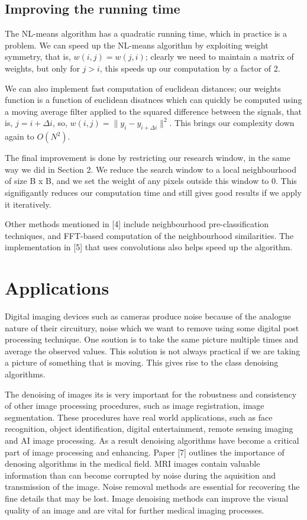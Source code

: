\documentclass[11pt, twocolumn]{article}
\begin{document}
\subsection{Improving the running time}
The NL-means algorithm has a quadratic running time, which in practice is a problem. We can speed up the NL-means algorithm by exploiting weight symmetry, that is, $w(i,j) = w(j,i)$; clearly we need to maintain a matrix of weights, but only for $j > i$, this speeds up our computation by a factor of 2. 

We can also implement fast computation of euclidean distances; our weights function is a function of euclidean disatnces which can quickly be computed using a moving average filter applied to the squared difference between the signals, that is, $j = i + \Delta i$, so, $w(i,j) = \parallel y_i - y_{i + \Delta i} \parallel ^2$. This brings our complexity down again to $O(N^2)$. 

The final improvement is done by restricting our research window, in the same way we did in Section 2. We reduce the search window to a local neighbourhood of size B x B, and we set the weight of any pixels outside this window to 0. This signifigantly reduces our computation time and still gives good results if we apply it iteratively. 

Other methods mentioned in [4] include neighbourhood pre-classification techniques, and FFT-based computation of the neighbourhood similarities. The implementation in [5] that uses convolutions also helps speed up the algorithm.
\section{Applications}
Digital imaging devices such as cameras produce noise because of the analogue nature of their circuitury, noise which we want to remove using some digital post processing technique. One soution is to take the same picture multiple times and average the observed values. This solution is not always practical if we are taking a picture of something that is moving. This gives rise to the class denoising algorithms.

The denoising of images its is very important for the robustness and consistency of other image processing procedures, such as image registration, image segmentation. These procedures have real world applications, such as face recognition, object identification, digital entertainment, remote sensing imaging and AI image processing. As a result denoising algorithms have become a critical part of image processing and enhancing. Paper [7] outlines the importance of denosing algorithms in the medical field. MRI images contain valuable information than can become corrupted by noise during the aquisition and transmission of the image. Noise removal methods are essential for recovering the fine details that may be lost. Image denoising methods can improve the visual quality of an image and are vital for further medical imaging processes.
\end{document}

